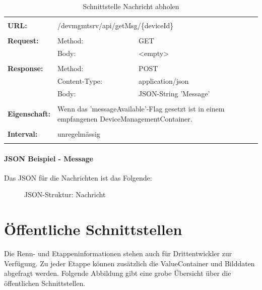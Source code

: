 {\renewcommand{\arraystretch}{1}
\begin{longtable}{ p{2.5cm} || p{3.5cm} p{5.5cm}}
&  \\ [-1.5ex]

	\textbf{URL:} & \multicolumn{2}{p{9cm}}{/devmgmtsrv/api/getMsg/\{deviceId\}}  \\ [1ex] \hline & &  \\ [-1.5ex]
	\textbf{Request:} & Method: & GET \\
		& Body: & <empty>  \\ [1ex] \hline & &  \\ [-1.5ex]
	\textbf{Response:} & Method: & POST \\
		& Content-Type: & application/json \\
		& Body: & JSON-String 'Message' \\ [1ex] \hline & &  \\ [-1.5ex]
	\textbf{Eigenschaft:} & \multicolumn{2}{p{9cm}}{ Wenn das 'messageAvailable'-Flag gesetzt ist in einem empfangenen DeviceManagementContainer.}  \\ [1ex] \hline & &  \\ [-1.5ex]
	\textbf{Interval:} & \multicolumn{2}{p{9cm}}{unregelmässig} \\ [1ex] 
	
\caption{Schnittstelle Nachricht abholen}
\end{longtable} }

\paragraph{JSON Beispiel - Message}
Das JSON für die Nachrichten ist das Folgende:
\begin{figure}[H]
	\centering
	
	\caption{JSON-Struktur: Nachricht}
\end{figure}

\newpage
\section{Öffentliche Schnittstellen}
\label{sec:tourlivepublicapi}

Die Renn- und Etappeninformationen stehen auch für Drittentwickler zur Verfügung. Zu jeder Etappe können zusätzlich die ValueContainer und Bilddaten abgefragt werden. Folgende Abbildung gibt eine grobe Übersicht über die öffentlichen Schnittstellen.

